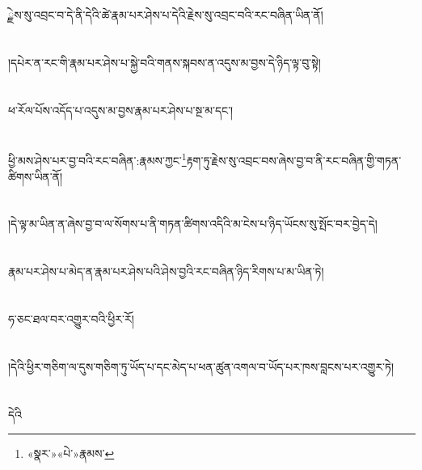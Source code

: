 ྗེས་སུ་འབྲང་བ་དེ་ནི་དེའི་ཚེ་རྣམ་པར་ཤེས་པ་དེའི་རྗེས་སུ་འབྲང་བའི་རང་བཞིན་ཡིན་ནོ།\chapter{ }།དཔེར་ན་རང་གི་རྣམ་པར་ཤེས་པ་སྐྱེ་བའི་གནས་སྐབས་ན་འདུས་མ་བྱས་དེ་ཉིད་ལྟ་བུ་སྟེ།\chapter{ }ཕ་རོལ་པོས་འདོད་པ་འདུས་མ་བྱས་རྣམ་པར་ཤེས་པ་སྔ་མ་དང་།\chapter{ }ཕྱི་མས་ཤེས་པར་བྱ་བའི་རང་བཞིན་:རྣམས་ཀྱང་\footnote{«སྣར་»«པེ་»རྣམས་}རྟག་ཏུ་རྗེས་སུ་འབྲང་བས་ཞེས་བྱ་བ་ནི་རང་བཞིན་གྱི་གཏན་ཚིགས་ཡིན་ནོ།\chapter{ }།དེ་ལྟ་མ་ཡིན་ན་ཞེས་བྱ་བ་ལ་སོགས་པ་ནི་གཏན་ཚིགས་འདིའི་མ་ངེས་པ་ཉིད་ཡོངས་སུ་སྤོང་བར་བྱེད་དེ།\chapter{ }རྣམ་པར་ཤེས་པ་མེད་ན་རྣམ་པར་ཤེས་པའི་ཤེས་བྱའི་རང་བཞིན་ཉིད་རིགས་པ་མ་ཡིན་ཏེ།\chapter{ }ཧ་ཅང་ཐལ་བར་འགྱུར་བའི་ཕྱིར་རོ།\chapter{ }།དེའི་ཕྱིར་གཅིག་ལ་དུས་གཅིག་ཏུ་ཡོད་པ་དང་མེད་པ་ཕན་ཚུན་འགལ་བ་ཡོད་པར་ཁས་བླངས་པར་འགྱུར་ཏེ།\chapter{ }དེའི